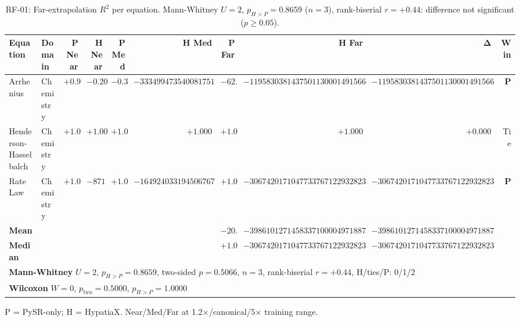 \begin{table}[htbp]
\centering
\caption{RF-01: Far-extrapolation $R^2$ per equation. Mann-Whitney $U=2$, $p_{H>P}=0.8659$ ($n=3$), rank-biserial $r=+0.44$: difference not significant ($p\geq0.05$).}
\label{tab:rf01_significance}
\small
\begin{tabular}{llrrrrrrrr}
\toprule
\textbf{Equation} & \textbf{Domain} & \textbf{P Near} & \textbf{H Near} & \textbf{P Med} & \textbf{H Med} & \textbf{P Far} & \textbf{H Far} & $\boldsymbol{\Delta}$ & \textbf{Win} \\
\midrule
Arrhenius & Chemistry & $+0.909$ & $-0.205$ & $-0.318$ & $-333499473540081751919512021011668718896095540982177853893781308650718213701632.000$ & $-62.875$ & $-1195830381437501130001491566345665818496351360664464580822118471106824888102708530925826057981318122441431429294181552714940416.000$ & $-1195830381437501130001491566345665818496351360664464580822118471106824888102708530925826057981318122441431429294181552714940416.000$ & \textbf{P} \\
Henderson-Hasselbalch & Chemistry & $+1.000$ & $+1.000$ & $+1.000$ & $+1.000$ & $+1.000$ & $+1.000$ & $+0.000$ & Tie \\
Rate Law & Chemistry & $+1.000$ & $-8714.315$ & $+1.000$ & $-1649240331945067678114250752.000$ & $+1.000$ & $-3067420171047733767122932823907893248.000$ & $-3067420171047733767122932823907893248.000$ & \textbf{P} \\
\midrule
\textbf{Mean} & & & & & & $-20.292$ & $-398610127145833710000497188781888606165450453554821526940706157035608296034236176975275352660439374147143809764727184238313472.000$ & $-398610127145833710000497188781888606165450453554821526940706157035608296034236176975275352660439374147143809764727184238313472.000$ & \\
\textbf{Median} & & & & & & $+1.000$ & $-3067420171047733767122932823907893248.000$ & $-3067420171047733767122932823907893248.000$ & \\
\midrule
\multicolumn{10}{l}{\textbf{Mann-Whitney} $U=2$, $p_{H>P}=0.8659$, two-sided $p=0.5066$, $n=3$, rank-biserial $r=+0.44$, H/ties/P: 0/1/2} \\
\multicolumn{10}{l}{\textbf{Wilcoxon} $W=0$, $p_{two}=0.5000$, $p_{H>P}=1.0000$} \\
\bottomrule
\end{tabular}
\begin{tablenotes}\small
\item P = PySR-only; H = HypatiaX. Near/Med/Far at 1.2×/canonical/5× training range.
\end{tablenotes}
\end{table}